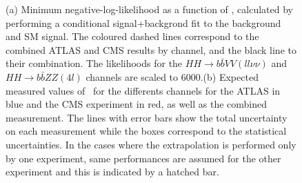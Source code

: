 




\begin{figure}[!htb]
\centering 
{} 
\caption{(a) Minimum negative-log-likelihood as a function of \kl, calculated by performing a conditional signal+backgrond fit to the background and SM signal. The coloured dashed lines correspond to the combined ATLAS and CMS results by channel, and the black line to their combination. The likelihoods for the $HH \rightarrow b\bar{b}VV(ll\nu\nu)$ and $HH \rightarrow b\bar{b}ZZ(4l)$ channels are scaled to 6000\fbinv.(b) Expected measured values of \kl\ for the differents channels for the ATLAS in blue and the CMS experiment in red, as well as the combined measurement. The lines with error bars show the total uncertainty on each measurement while the boxes correspond to the statistical uncertainties. In the cases where the extrapolation is performed only by one experiment, same performances are assumed for the other experiment and this is indicated by a hatched bar.} 
\label{fig:comb_HH} 
\end{figure}


